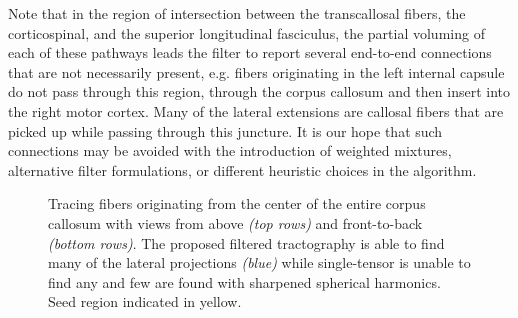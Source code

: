 \documentclass[final,hyperref]{gatech-thesis}
\begin{document}
Note that in the region of intersection between the transcallosal fibers, the
corticospinal, and the superior longitudinal fasciculus, the partial voluming
of each of these pathways leads the filter to report several end-to-end
connections that are not necessarily present, e.g. fibers originating in the
left internal capsule do not pass through this region, through the corpus
callosum and then insert into the right motor cortex.  Many of the lateral
extensions are callosal fibers that are picked up while passing through this
juncture.  It is our hope that such connections may be avoided with the
introduction of weighted mixtures, alternative filter formulations, or
different heuristic choices in the algorithm.

\clearpage
\begin{figure}[p]
  \centering

  \caption{Tracing fibers originating from the center of the entire corpus
    callosum with views from above \textit{(top rows)} and front-to-back
    \textit{(bottom rows)}.  The proposed filtered tractography is able to
    find many of the lateral projections \textit{(blue)} while single-tensor
    is unable to find any and few are found with sharpened spherical
    harmonics.  Seed region indicated in yellow.}
  \label{fig:W_cc}
\end{figure}
\end{document}
